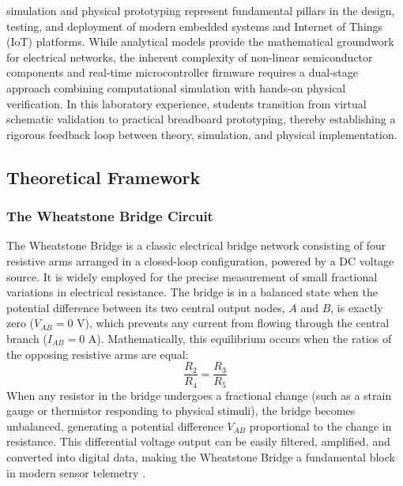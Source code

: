 % 
% 
% 
% 
 simulation and physical prototyping represent fundamental pillars in the design, testing, and deployment of modern embedded systems and Internet of Things (IoT) platforms. While analytical models provide the mathematical groundwork for electrical networks, the inherent complexity of non-linear semiconductor components and real-time microcontroller firmware requires a dual-stage approach combining computational simulation with hands-on physical verification. In this laboratory experience, students transition from virtual schematic validation to practical breadboard prototyping, thereby establishing a rigorous feedback loop between theory, simulation, and physical implementation.\@



\subsection{Theoretical Framework}

\subsubsection{The Wheatstone Bridge Circuit}
The Wheatstone Bridge is a classic electrical bridge network consisting of four resistive arms arranged in a closed-loop configuration, powered by a DC voltage source. It is widely employed for the precise measurement of small fractional variations in electrical resistance. The bridge is in a balanced state when the potential difference between its two central output nodes, $A$ and $B$, is exactly zero ($V_{AB} = 0\text{ V}$), which prevents any current from flowing through the central branch ($I_{AB} = 0\text{ A}$). Mathematically, this equilibrium occurs when the ratios of the opposing resistive arms are equal:
\begin{equation}
    \frac{R_2}{R_4} = \frac{R_3}{R_5}
\end{equation}
When any resistor in the bridge undergoes a fractional change (such as a strain gauge or thermistor responding to physical stimuli), the bridge becomes unbalanced, generating a potential difference $V_{AB}$ proportional to the change in resistance. This differential voltage output can be easily filtered, amplified, and converted into digital data, making the Wheatstone Bridge a fundamental block in modern sensor telemetry \cite{pamungkas2023, harris2020}.

